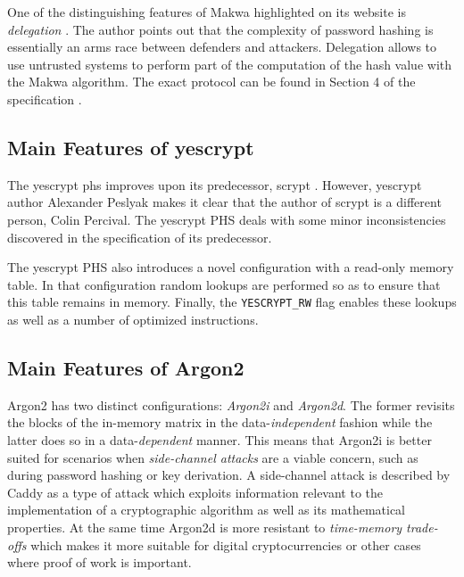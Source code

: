 One of the distinguishing features of Makwa highlighted on its website is \emph{delegation} \cite{makwa:2017:homepage}. The author points out that the complexity of password hashing is essentially an arms race between defenders and attackers. Delegation allows to use untrusted systems to perform part of the computation of the hash value with the Makwa algorithm. The exact protocol can be found in Section 4 of the specification \cite{pornin:2015:makwa-spec}.

\subsection{Main Features of yescrypt}
\label{sec:yescrypt}

The yescrypt \gls{phs} \cite{peslyak:2015:yescrypt} improves upon its predecessor, scrypt \cite{percival:2016:scrypt}. However, yescrypt author Alexander Peslyak makes it clear that the author of scrypt is a different person, Colin Percival. The yescrypt PHS deals with some minor inconsistencies discovered in the specification of its predecessor.

The yescrypt PHS also introduces a novel configuration with a read-only memory table. In that configuration random lookups are performed so as to ensure that this table remains in memory. Finally, the \texttt{YESCRYPT\_RW} flag enables these lookups as well as a number of optimized instructions.

\subsection{Main Features of Argon2}
\label{sec:argon2}

Argon2 \cite{biryukov:2015:argon2} has two distinct configurations: \emph{Argon2i} and \emph{Argon2d}. The former revisits the blocks of the in-memory matrix in the data-\emph{independent} fashion while the latter does so in a data-\emph{dependent} manner. This means that Argon2i is better suited for scenarios when \emph{side-channel attacks} are a viable concern, such as during password hashing or key derivation. A side-channel attack is described by Caddy \cite{caddy:2005:side-channel} as a type of attack which exploits information relevant to the implementation of a cryptographic algorithm as well as its mathematical properties. At the same time Argon2d is more resistant to \emph{time-memory trade-offs} which makes it more suitable for digital cryptocurrencies or other cases where proof of work is important.

